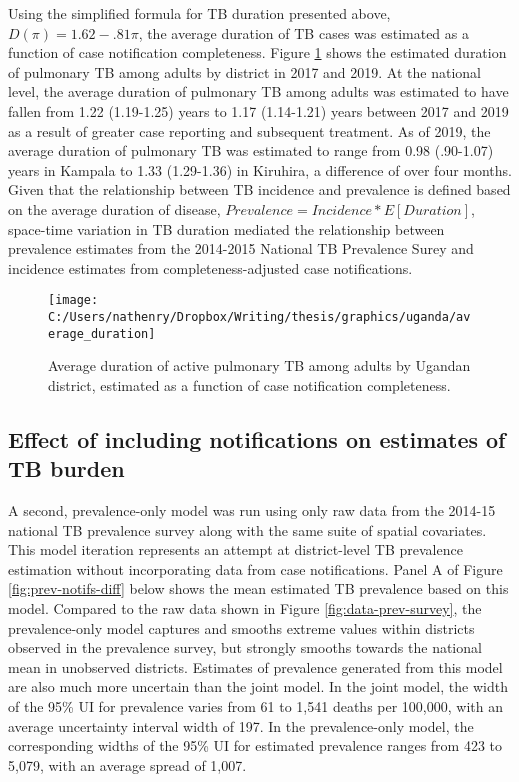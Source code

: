 \documentclass[
]{article}
\begin{document}
Using the simplified formula for TB duration presented above, \(D(\pi) = 1.62 - .81\pi\), the average duration of TB cases was estimated as a function of case notification completeness. Figure \ref{fig:average-duration} shows the estimated duration of pulmonary TB among adults by district in 2017 and 2019. At the national level, the average duration of pulmonary TB among adults was estimated to have fallen from 1.22 (1.19-1.25) years to 1.17 (1.14-1.21) years between 2017 and 2019 as a result of greater case reporting and subsequent treatment. As of 2019, the average duration of pulmonary TB was estimated to range from 0.98 (.90-1.07) years in Kampala to 1.33 (1.29-1.36) in Kiruhira, a difference of over four months. Given that the relationship between TB incidence and prevalence is defined based on the average duration of disease, \(Prevalence = Incidence * E[Duration]\), space-time variation in TB duration mediated the relationship between prevalence estimates from the 2014-2015 National TB Prevalence Surey and incidence estimates from completeness-adjusted case notifications.

\begin{figure}[!ht]

{\centering \texttt{[image: C:/Users/nathenry/Dropbox/Writing/thesis/graphics/uganda/average\_duration]} 

}

\caption{Average duration of active pulmonary TB among adults by Ugandan district, estimated as a function of case notification completeness.}\label{fig:average-duration}
\end{figure}

\hypertarget{effect-of-including-notifications-on-estimates-of-tb-burden}{%
\subsection{Effect of including notifications on estimates of TB burden}\label{effect-of-including-notifications-on-estimates-of-tb-burden}}

A second, prevalence-only model was run using only raw data from the 2014-15 national TB prevalence survey along with the same suite of spatial covariates. This model iteration represents an attempt at district-level TB prevalence estimation without incorporating data from case notifications. Panel A of Figure \ref{fig:prev-notifs-diff} below shows the mean estimated TB prevalence based on this model. Compared to the raw data shown in Figure \ref{fig:data-prev-survey}, the prevalence-only model captures and smooths extreme values within districts observed in the prevalence survey, but strongly smooths towards the national mean in unobserved districts. Estimates of prevalence generated from this model are also much more uncertain than the joint model. In the joint model, the width of the 95\% UI for prevalence varies from 61 to 1,541 deaths per 100,000, with an average uncertainty interval width of 197. In the prevalence-only model, the corresponding widths of the 95\% UI for estimated prevalence ranges from 423 to 5,079, with an average spread of 1,007.
\end{document}
